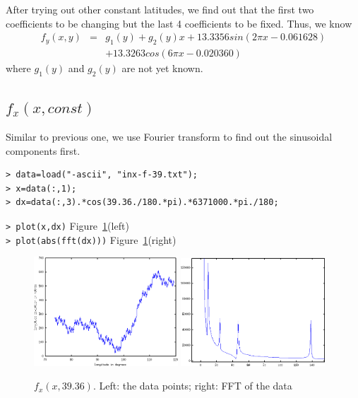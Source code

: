\documentclass[a4paper]{article}
\begin{document}
After trying out other constant latitudes, we find out that the first two
coefficients to be changing but the last 4 coefficients to be fixed.
Thus, we know
\begin{eqnarray}
\label{eq:fyx}
f_y(x,y) & = & g_1(y)+g_2(y)x+13.3356sin(2\pi x-0.061628) \nonumber \\
         &   & +13.3263cos(6\pi x-0.020360)
\end{eqnarray}
where $g_1(y)$ and $g_2(y)$ are not yet known.

\subsection{$f_x(x, const)$}
Similar to previous one, we use Fourier transform to find out the sinusoidal
components first.
\begin{verbatim}
> data=load("-ascii", "inx-f-39.txt");
> x=data(:,1);
> dx=data(:,3).*cos(39.36./180.*pi).*6371000.*pi./180;
\end{verbatim}
\verb|> plot(x,dx)| \hfill Figure~\ref{fig:fxx-fft}(left) \\
\verb|> plot(abs(fft(dx)))| \hfill Figure~\ref{fig:fxx-fft}(right) \\

\begin{figure}[htb]
\begin{center}
\includegraphics[width=0.48\textwidth]{fxx-data.png}
\includegraphics[width=0.48\textwidth]{fxx-fft.png}
\end{center}
\caption{$f_x(x,39.36)$. Left: the data points; right: FFT of the data}
\label{fig:fxx-fft}
\end{figure}
\end{document}
